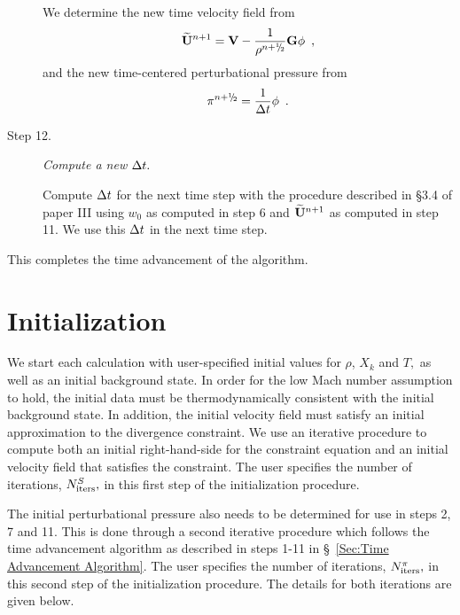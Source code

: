 \begin{description}
We determine the new time velocity field from
\begin{equation}
\Ubt^{n+1} = {\bf V} - \frac{1}{\rho^\nph} \mathbf{G} \phi \enskip ,
\end{equation}
and the new time-centered perturbational pressure from
\begin{equation}
  \pi^\nph = \frac{1}{\dt} \phi \enskip .
\end{equation}

\item[Step 12.] {\em Compute a new $\Delta t.$}

Compute $\Delta t$ for the next time step with the procedure described in \S 3.4 of paper III
using $w_0$ as computed in step 6 and
$\widetilde{{\bf U}}^{n+1}$ as computed in step 11.  We use this $\Delta t$ in the next time step. 


\end{description}

\noindent This completes the time advancement of the algorithm.




\section{Initialization}\label{Sec:Initialization}

We start each calculation with user-specified initial values for
$\rho$, $X_k$ and $T,$ as well as an initial background state.  In
order for the low Mach number assumption to hold, the initial data
must be thermodynamically consistent with the initial background
state.  In addition, the initial velocity field must satisfy an
initial approximation to the divergence constraint.  We use an iterative
procedure to compute both an initial right-hand-side for the
constraint equation and an initial velocity field that satisfies
the constraint.  The user specifies the number of iterations,
$N_{\rm iters}^{S},$ in this first step of the initialization procedure.

The initial perturbational pressure also needs to be determined for
use in steps 2, 7 and 11. 
This is done through a second iterative procedure which follows the
time advancement algorithm as described in steps 1-11 in 
\S~\ref{Sec:Time Advancement Algorithm}.  
The user specifies the number of iterations, 
$N_{\rm iters}^{\pi},$ in this second step of the initialization procedure.
The details for both iterations are given below.\\

